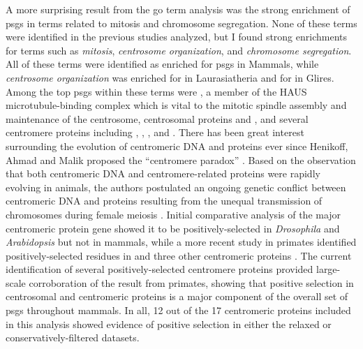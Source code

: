 A more surprising result from the \ac{go} term analysis was the strong
enrichment of \acp{psg} in terms related to mitosis and chromosome
segregation. None of these terms were identified in the previous
studies analyzed, but I found strong enrichments for terms such as
\emph{mitosis}, \emph{centrosome organization}, and \emph{chromosome
  segregation}. All of these terms were identified as enriched for
\psgeone \acp{psg} in Mammals, while \emph{centrosome organization}
was enriched for \psgeone in Laurasiatheria and for \psgefive in
Glires. Among the top \acp{psg} within these terms were ,
a member of the HAUS microtubule-binding complex which is vital to the
mitotic spindle assembly and maintenance of the centrosome,
centrosomal proteins  and , and several
centromere proteins including , ,
, and . There has been great interest
surrounding the evolution of centromeric DNA and proteins ever since
Henikoff, Ahmad and Malik proposed the ``centromere paradox''
\citeyearpar{Henikoff2001}. Based on the observation that both
centromeric DNA and centromere-related proteins were rapidly evolving
in animals, the authors postulated an ongoing genetic conflict between
centromeric DNA and proteins resulting from the unequal transmission
of chromosomes during female meiosis
\citep{Henikoff2001,Malik2002,Malik2009}. Initial comparative analysis
of the major centromeric protein  gene showed it to be
positively-selected in \emph{Drosophila} and \emph{Arabidopsis} but
not in mammals, while a more recent study in primates identified
positively-selected residues in  and three other
centromeric proteins \citep{Schueler2010}. The current identification
of several positively-selected centromere proteins provided
large-scale corroboration of the result from primates, showing that
positive selection in centrosomal and centromeric proteins is a major
component of the overall set of \acp{psg} throughout mammals. In all,
12 out of the 17 centromeric proteins included in this analysis showed
evidence of positive selection in either the relaxed or
conservatively-filtered datasets.


